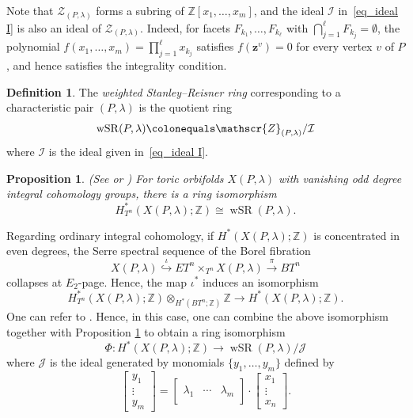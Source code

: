 \documentclass[10pt]{amsart}
\theoremstyle{plain}
\newtheorem{proposition}[theorem]{Proposition}
\theoremstyle{definition}
\newtheorem{definition}[theorem]{Definition}
\numberwithin{equation}{section}
\newcommand{\ZZ}{\mathbb{Z}}
\DeclareMathOperator{\wSR}{wSR}
\begin{document}
Note that $\mathscr{Z}_{(P, \lambda)}$ forms a subring of $\ZZ[x_1, \dots, x_m]$, and
the ideal $\mathcal{I}$ in~\eqref{eq_ideal I} is also an ideal of $\mathscr{Z}_{(P,\lambda)}$. Indeed, for facets $F_{k_1}, \dots, F_{k_\ell}$ with $\bigcap_{j=1}^\ell F_{k_j}= \emptyset$, the polynomial $f(x_1, \dots, x_m)=\prod_{j=1}^\ell x_{k_j}$ satisfies $f(\mathbf{z}^v)=0$ for every vertex $v$ of $P$, and hence satisfies the integrality condition. 

\begin{definition}\label{def_wSR}
The \emph{weighted Stanley--Reisner ring} corresponding to a characteristic pair $(P, \lambda)$ is the quotient ring
\[
\wSR(P, \lambda) \colonequals \mathscr{Z}_{(P, \lambda)} /  \mathcal{I}
\]
where $\mathcal{I}$ is the ideal given in~\eqref{eq_ideal I}.
\end{definition}



\begin{proposition}(See \cite[Section 5]{BSS} or \cite[Theorem 4.11]{DKS})
\label{prop_eqiv_cohom_wSR}
For toric orbifolds $X(P, \lambda)$ with vanishing odd degree integral cohomology groups, there is a ring isomorphism 
\[
H^\ast_{T^n}(X(P, \lambda);\ZZ) \cong \wSR(P, \lambda).
\]
\end{proposition}


Regarding ordinary integral cohomology, if $H^*(X(P,\lambda);\ZZ)$ is concentrated in even degrees, the Serre spectral sequence of the Borel fibration 
\[
X(P,\lambda) \overset{\iota}{\hookrightarrow} ET^n\times_{T^n} X(P,\lambda) \xrightarrow{\pi} BT^n
\]
collapses at $E_2$-page. Hence, the map $\iota^\ast$ induces an isomorphism 
\[
H^{\ast}_{T^n}(X(P, \lambda);\ZZ)\otimes_{H^\ast(BT^n;\ZZ)} \ZZ \to H^\ast(X(P, \lambda);\ZZ).
\]
One can refer to \cite[theorem 1.1]{FrPu}. Hence, in this case, one can combine the above isomorphism together with Proposition \ref{prop_eqiv_cohom_wSR} to obtain a ring isomorphism 
\begin{equation}\label{eq_cohmgy_isom}
\Phi\colon H^*(X(P,\lambda);\ZZ)\to\wSR(P,\lambda) / \mathcal{J}
\end{equation}
where $\mathcal{J}$ is the ideal generated by monomials $\{y_1,\ldots,y_m\}$ defined by
\[
\begin{bmatrix} y_1 \\ \vdots \\ y_m \end{bmatrix} = 
\left[ \begin{array}{c|c|c} 
& & \\
\lambda_1 & \cdots &  \lambda_m \\
& & 
\end{array}\right]
\cdot \begin{bmatrix} x_1 \\ \vdots  \\ x_n \end{bmatrix}.
\]
\end{document}
